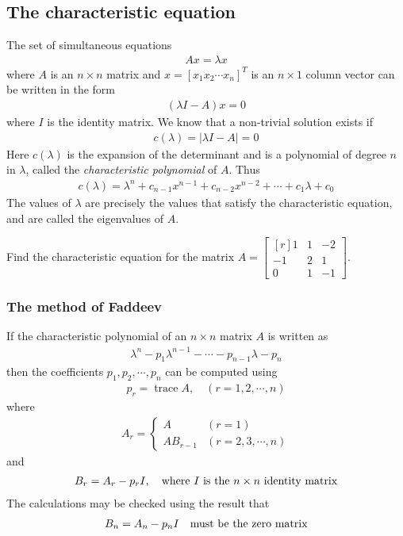 \documentclass[12pt,a4paper,fleqn]{mycalc}
\begin{document}
	\subsection{The characteristic equation}
	The set of simultaneous equations
	\begin{align*}
	Ax=\lambda x
	\end{align*}
	where $ A $ is an $ n \times n $ matrix and $ x = [x_1 x_2 \cdots x_n]^{T} $ is an $ n \times 1 $ column vector can be written in the form
	\begin{align*}
	(\lambda I-A)x=0
	\end{align*}
	where $ I $ is the identity matrix. We know that a non-trivial solution exists if
	\begin{align*}
	c(\lambda) = |\lambda I - A | = 0
	\end{align*}
	Here $ c(\lambda) $ is the expansion of the determinant and is a polynomial of degree $ n $ in $\lambda$, called the \emph{characteristic polynomial} of $ A. $ Thus
	\begin{align*}
	c(\lambda)=\lambda^{n}+c_{n-1}x^{n-1}+c_{n-2}x^{n-2}+\cdots+c_1\lambda+c_0
	\end{align*}
	The values of $ \lambda $ are precisely the values that satisfy the characteristic equation, and are called the eigenvalues of $ A. $
	\begin{example}
		Find the characteristic equation for the matrix
		$ A=\begin{bmatrix*}[r]
		1 & 1 & -2\\
		-1 & 2 & 1\\
		0 & 1 & -1
		\end{bmatrix*}. $
	\end{example}
	\subsubsection{The method of Faddeev}
	If the characteristic polynomial of an $ n \times n $ matrix $ A $ is written as
	\begin{align*}
	\lambda^n - p_1\lambda^{n-1} - \cdots - p_{n-1}\lambda - p_n
	\end{align*}
	then the coefficients $ p_1, p_2, \cdots , p_n $ can be computed using
	\begin{align*}
	p_r=\operatorname{trace} A,\quad (r=1,2,\cdots,n)
	\end{align*}
	where
	\begin{align*}
	A_r=\begin{cases}
	A &(r=1)\\
	AB_{r-1}&(r=2,3,\cdots,n)
	\end{cases}
	\end{align*}
	and
	\begin{align*}
	B_r=A_r-p_rI,\quad\textnormal{where $ I $ is the $ n\times n $ identity matrix}
	\end{align*}
	The calculations may be checked using the result that
	\begin{align*}
	B_n = A_n - p_nI\quad\textnormal{must be the zero matrix}
	\end{align*}
\end{document}
